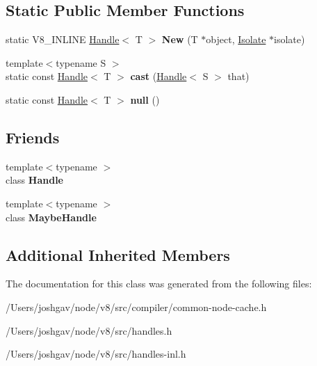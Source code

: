 \subsection*{Static Public Member Functions}
\begin{DoxyCompactItemize}
\item 
static V8\+\_\+\+I\+N\+L\+I\+NE \hyperlink{classv8_1_1internal_1_1_handle}{Handle}$<$ T $>$ {\bfseries New} (T $\ast$object, \hyperlink{classv8_1_1internal_1_1_isolate}{Isolate} $\ast$isolate)\hypertarget{classv8_1_1internal_1_1_handle_ad348890679aca96078fa60a622a798aa}{}\label{classv8_1_1internal_1_1_handle_ad348890679aca96078fa60a622a798aa}

\item 
{\footnotesize template$<$typename S $>$ }\\static const \hyperlink{classv8_1_1internal_1_1_handle}{Handle}$<$ T $>$ {\bfseries cast} (\hyperlink{classv8_1_1internal_1_1_handle}{Handle}$<$ S $>$ that)\hypertarget{classv8_1_1internal_1_1_handle_a5b75ef088fce8d626304bf6a27bfbfff}{}\label{classv8_1_1internal_1_1_handle_a5b75ef088fce8d626304bf6a27bfbfff}

\item 
static const \hyperlink{classv8_1_1internal_1_1_handle}{Handle}$<$ T $>$ {\bfseries null} ()\hypertarget{classv8_1_1internal_1_1_handle_a5370e41511ebb3dd59333d20f35fe9ab}{}\label{classv8_1_1internal_1_1_handle_a5370e41511ebb3dd59333d20f35fe9ab}

\end{DoxyCompactItemize}
\subsection*{Friends}
\begin{DoxyCompactItemize}
\item 
{\footnotesize template$<$typename $>$ }\\class {\bfseries Handle}\hypertarget{classv8_1_1internal_1_1_handle_a67ca1a2d91273eaf85fb3d23ba8ce984}{}\label{classv8_1_1internal_1_1_handle_a67ca1a2d91273eaf85fb3d23ba8ce984}

\item 
{\footnotesize template$<$typename $>$ }\\class {\bfseries Maybe\+Handle}\hypertarget{classv8_1_1internal_1_1_handle_a43ca95cbc5708225727b3674f4690233}{}\label{classv8_1_1internal_1_1_handle_a43ca95cbc5708225727b3674f4690233}

\end{DoxyCompactItemize}
\subsection*{Additional Inherited Members}


The documentation for this class was generated from the following files\+:\begin{DoxyCompactItemize}
\item 
/\+Users/joshgav/node/v8/src/compiler/common-\/node-\/cache.\+h\item 
/\+Users/joshgav/node/v8/src/handles.\+h\item 
/\+Users/joshgav/node/v8/src/handles-\/inl.\+h\end{DoxyCompactItemize}
